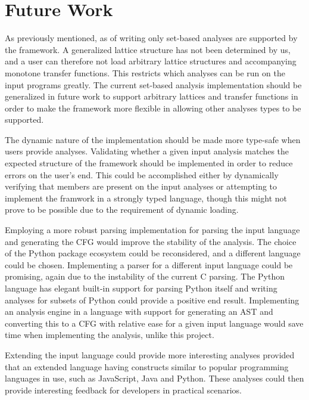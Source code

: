 \section{Future Work}

\newpar As previously mentioned, as of writing only set-based analyses are supported by the framework. A generalized lattice structure has not been determined by us, and a user can therefore not load arbitrary lattice structures and accompanying monotone transfer functions. This restricts which analyses can be run on the input programs greatly. The current set-based analysis implementation should be generalized in future work to support arbitrary lattices and transfer functions in order to make the framework more flexible in allowing other analyses types to be supported. 

\newpar The dynamic nature of the implementation should be made more type-safe when users provide analyses. Validating whether a given input analysis matches the expected structure of the framework should be implemented in order to reduce errors on the user's end. This could be accomplished either by dynamically verifying that members are present on the input analyses or attempting to implement the framwork in a strongly typed language, though this might not prove to be possible due to the requirement of dynamic loading.

\newpar Employing a more robust parsing implementation for parsing the input language and generating the CFG would improve the stability of the analysis. The choice of the Python package ecosystem could be reconsidered, and a different language could be chosen. Implementing a parser for a different input language could be promising, again due to the instability of the current C parsing. The Python language has elegant built-in support for parsing Python itself and writing analyses for subsets of Python could provide a positive end result. Implementing an analysis engine in a language with support for generating an AST and converting this to a CFG with relative ease for a given input language would save time when implementing the analysis, unlike this project.

\newpar Extending the input language could provide more interesting analyses provided that an extended language having constructs similar to popular programming languages in use, such as JavaScript, Java and Python\cite{github:languages}. These analyses could then provide interesting feedback for developers in practical scenarios.